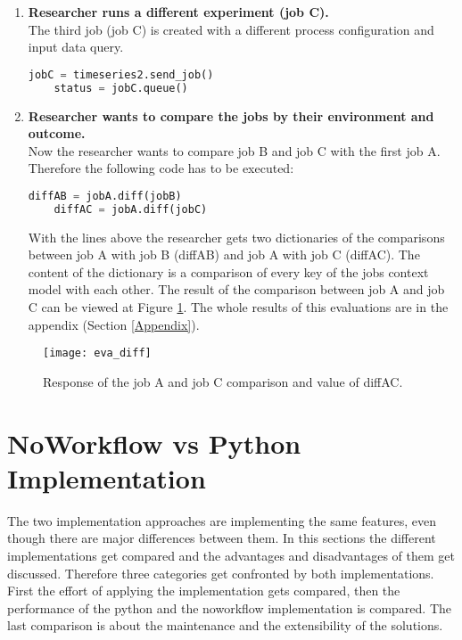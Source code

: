 \documentclass[draft,final]{vutinfth} %
\begin{document}
\begin{enumerate}
	\item \textbf{Researcher runs a different experiment (job C).}\\
	The third job (job C) is created with a different process configuration and input data query.
	\begin{lstlisting}[frame=single, language=Python]
	jobC = timeseries2.send_job()
	status = jobC.queue()
	\end{lstlisting}   
	\item \textbf{Researcher wants to compare the jobs by their environment and outcome.}\\
	Now the researcher wants to compare job B and job C with the first job A. Therefore the following code has to be executed:
	\begin{lstlisting}[frame=single, language=Python]
	diffAB = jobA.diff(jobB)
	diffAC = jobA.diff(jobC)
	\end{lstlisting}  
	With the lines above the researcher gets two dictionaries of the comparisons between job A with job B (diffAB) and job A with job C (diffAC). The content of the dictionary is a comparison of every key of the jobs context model with each other. The result of the comparison between job A and job C can be viewed at Figure \ref{fig:eva_diff}. The whole results of this evaluations are in the appendix (Section \ref{Appendix}).   
\end{enumerate}

\begin{figure}[h]
	\centering
	\texttt{[image: eva\_diff]}
	\caption{Response of the job A and job C comparison and value of diffAC.}
	\label{fig:eva_diff} %
\end{figure}


\section{NoWorkflow vs Python Implementation}\label{Evaluation:NvsP}
The two implementation approaches are implementing the same features, even though there are major differences between them. In this sections the different implementations get compared and the advantages and disadvantages of them get discussed. Therefore three categories get confronted by both implementations. First the effort of applying the implementation gets compared, then the performance of the python and the noworkflow implementation is compared. The last comparison is about the maintenance and the extensibility of the solutions. 
\end{document}
